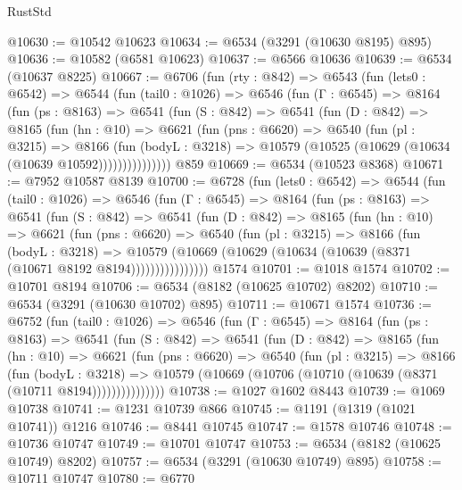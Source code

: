 \begin{lexlean}{RustStd}
\begin{coremodule}
@10630 := @10542 @10623
@10634 := @6534 (@3291 (@10630 @8195) @895)
@10636 := @10582 (@6581 @10623)
@10637 := @6566 @10636
@10639 := @6534 (@10637 @8225)
@10667 := @6706
    (fun (rty : @842) =>
    @6543
      (fun (lets0 : @6542) =>
      @6544
        (fun (tail0 : @1026) =>
        @6546
          (fun (Γ : @6545) =>
          @8164
            (fun (ps : @8163) =>
            @6541
              (fun (S : @842) =>
              @6541
                (fun (D : @842) =>
                @8165
                  (fun (hn : @10) =>
                  @6621
                    (fun (pns : @6620) =>
                    @6540
                      (fun (pl : @3215) =>
                      @8166
                        (fun (bodyL : @3218) =>
                        @10579 (@10525 (@10629 (@10634 (@10639 @10592)))))))))))))))
    @859
@10669 := @6534 (@10523 @8368)
@10671 := @7952 @10587 @8139
@10700 := @6728
    (fun (lets0 : @6542) =>
    @6544
      (fun (tail0 : @1026) =>
      @6546
        (fun (Γ : @6545) =>
        @8164
          (fun (ps : @8163) =>
          @6541
            (fun (S : @842) =>
            @6541
              (fun (D : @842) =>
              @8165
                (fun (hn : @10) =>
                @6621
                  (fun (pns : @6620) =>
                  @6540
                    (fun (pl : @3215) =>
                    @8166
                      (fun (bodyL : @3218) =>
                      @10579
                        (@10669 (@10629 (@10634 (@10639 (@8371 (@10671 @8192 @8194))))))))))))))))
    @1574
@10701 := @1018 @1574
@10702 := @10701 @8194
@10706 := @6534 (@8182 (@10625 @10702) @8202)
@10710 := @6534 (@3291 (@10630 @10702) @895)
@10711 := @10671 @1574
@10736 := @6752
    (fun (tail0 : @1026) =>
    @6546
      (fun (Γ : @6545) =>
      @8164
        (fun (ps : @8163) =>
        @6541
          (fun (S : @842) =>
          @6541
            (fun (D : @842) =>
            @8165
              (fun (hn : @10) =>
              @6621
                (fun (pns : @6620) =>
                @6540
                  (fun (pl : @3215) =>
                  @8166
                    (fun (bodyL : @3218) =>
                    @10579 (@10669 (@10706 (@10710 (@10639 (@8371 (@10711 @8194)))))))))))))))
@10738 := @1027 @1602 @8443
@10739 := @1069 @10738
@10741 := @1231 @10739 @866
@10745 := @1191 (@1319 (@1021 @10741)) @1216
@10746 := @8441 @10745
@10747 := @1578 @10746
@10748 := @10736 @10747
@10749 := @10701 @10747
@10753 := @6534 (@8182 (@10625 @10749) @8202)
@10757 := @6534 (@3291 (@10630 @10749) @895)
@10758 := @10711 @10747
@10780 := @6770

\end{coremodule}
\end{lexlean}
